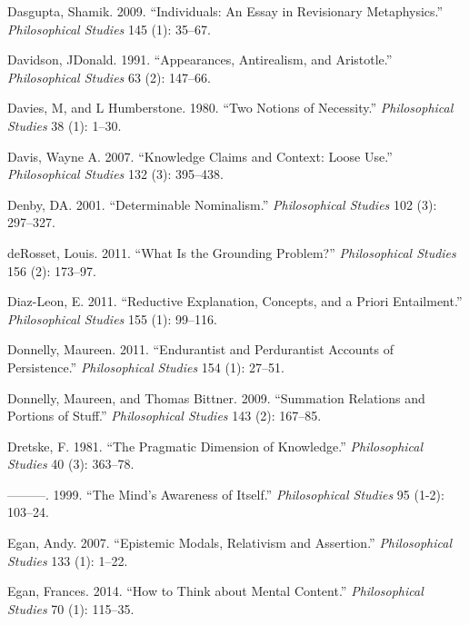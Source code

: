 \documentclass[
  10pt,
  letterpaper,
  DIV=11,
  numbers=noendperiod,
  twoside]{scrartcl}
\newlength{\cslhangindent}
\newenvironment{CSLReferences}[2] %
 {\begin{list}{}{%
  \setlength{\itemindent}{0pt}
  \setlength{\leftmargin}{0pt}
  \setlength{\parsep}{0pt}
  \ifodd #1
   \setlength{\leftmargin}{\cslhangindent}
   \setlength{\itemindent}{-1\cslhangindent}
  \fi
  \setlength{\itemsep}{#2\baselineskip}}}
 {\end{list}}
\begin{document}
\begin{CSLReferences}{1}{0}
Dasgupta, Shamik. 2009. {``Individuals: An Essay in Revisionary
Metaphysics.''} \emph{Philosophical Studies} 145 (1): 35--67.

Davidson, JDonald. 1991. {``Appearances, Antirealism, and Aristotle.''}
\emph{Philosophical Studies} 63 (2): 147--66.

Davies, M, and L Humberstone. 1980. {``Two Notions of Necessity.''}
\emph{Philosophical Studies} 38 (1): 1--30.

Davis, Wayne A. 2007. {``Knowledge Claims and Context: Loose Use.''}
\emph{Philosophical Studies} 132 (3): 395--438.

Denby, DA. 2001. {``Determinable Nominalism.''} \emph{Philosophical
Studies} 102 (3): 297--327.

deRosset, Louis. 2011. {``What Is the Grounding Problem?''}
\emph{Philosophical Studies} 156 (2): 173--97.

Diaz-Leon, E. 2011. {``Reductive Explanation, Concepts, and a Priori
Entailment.''} \emph{Philosophical Studies} 155 (1): 99--116.

Donnelly, Maureen. 2011. {``Endurantist and Perdurantist Accounts of
Persistence.''} \emph{Philosophical Studies} 154 (1): 27--51.

Donnelly, Maureen, and Thomas Bittner. 2009. {``Summation Relations and
Portions of Stuff.''} \emph{Philosophical Studies} 143 (2): 167--85.

Dretske, F. 1981. {``The Pragmatic Dimension of Knowledge.''}
\emph{Philosophical Studies} 40 (3): 363--78.

---------. 1999. {``The Mind's Awareness of Itself.''}
\emph{Philosophical Studies} 95 (1-2): 103--24.

Egan, Andy. 2007. {``Epistemic Modals, Relativism and Assertion.''}
\emph{Philosophical Studies} 133 (1): 1--22.

Egan, Frances. 2014. {``How to Think about Mental Content.''}
\emph{Philosophical Studies} 70 (1): 115--35.


\end{CSLReferences}
\end{document}
